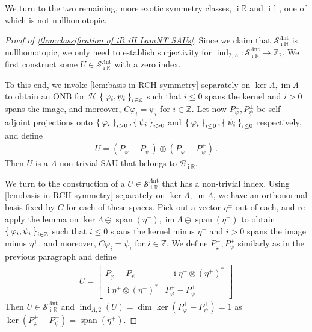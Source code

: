 \documentclass[a4paper,10pt]{article}
\numberwithin{equation}{section}
\theoremstyle{plain}
\theoremstyle{plain}
\theoremstyle{plain}
\theoremstyle{plain}
\theoremstyle{plain}
\theoremstyle{remark}
\theoremstyle{definition}
\theoremstyle{plain}
\newcommand{\ii}{\operatorname{i}}
\newcommand{\ZZ}{\mathbb{Z}}
\newcommand{\RR}{\mathbb{R}}
\newcommand{\calB}{\mathcal{B}}
\newcommand{\calSU}{\mathcal{S}}
\newcommand{\calH}{\mathcal{H}}
\newcommand{\LamNT}{\Lambda\mathrm{nt}}
\newcommand{\LamNTSAU}{\calSU^{\LamNT}}
\newcommand{\szpan}{\operatorname{span}}
\newcommand{\vf}{\varphi}
\newcommand{\HH}{\mathbb{H}}
\newcommand{\findex}{\operatorname{ind}}
\newcommand{\im}{\operatorname{im}}
\newcommand{\eq}[1]{\begin{align*}#1\end{align*}}
\begin{document}
	
	We turn to the two remaining, more exotic symmetry classes, $\ii \RR$ and $\ii \HH$, one of which is not nullhomotopic.
	\begin{proof}[Proof of \cref{thm:classification of iR iH LamNT SAUs}] Since we claim that $\LamNTSAU_{\ii \HH}$ is nullhomotopic, we only need to establish surjectivity for $\findex_{2,\Lambda}:\LamNTSAU_{\ii \RR}\to\ZZ_2$. We first construct some $U\in\LamNTSAU_{\ii \RR}$ with a zero index. 
		
		To this end, we invoke \cref{lem:basis in RCH symmetry} separately on $\ker\Lambda,\im\Lambda$ to obtain an ONB for $\calH$ $\Set{\vf_i,\psi_i}_{i\in\ZZ}$ such that $i\leq0$ spans the kernel and $i>0$ spans the image, and moreover, $C\vf_i=\psi_i$ for $i\in\ZZ$. Let now $P^\pm_\vf,P^\pm_\psi$ be self-adjoint projections onto $\Set{\vf_i}_{i>0},\Set{\psi_i}_{i>0}$ and $\Set{\vf_i}_{i\leq0},\Set{\psi_i}_{i\leq0}$ respectively, and define \eq{U=(P_\vf^--P_\psi^-)\oplus (P_{\vf}^+-P_{\psi}^+)\,.} Then $U$ is a $\Lambda$-non-trivial SAU that belongs to $\calB_{\ii\RR}.$
		
		We turn to the construction of a $U\in\LamNTSAU_{\ii\RR}$ that has a non-trivial index. Using \cref{lem:basis in RCH symmetry} separately on $\ker\Lambda,\im\Lambda$, we have an orthonormal basis fixed by $C$ for each of these spaces. Pick out a vector $\eta^\pm$ out of each, and re-apply the lemma on $\ker\Lambda\ominus\szpan(\eta^-),\im\Lambda\ominus\szpan(\eta^+)$ to obtain $\Set{\vf_i,\psi_i}_{i\in\ZZ}$ such that $i\leq0$ spans the kernel minus $\eta^-$ and $i>0$ spans the image minus $\eta^+$, and moreover, $C\vf_i=\psi_i$ for $i\in\ZZ$. We define $P^\pm_\vf,P^\pm_\psi$ similarly as in the previous paragraph and define \eq{U=\begin{bmatrix} P_\vf^--P_\psi^- & -\ii\eta^-\otimes \left(\eta^+\right)^\ast \\ \ii\eta^+\otimes \left(\eta^-\right)^\ast & P_{\vf}^+-P_{\psi}^+\end{bmatrix}} Then $U\in\LamNTSAU_{\ii\RR}$ and $\findex_{\Lambda,2}(U)=\dim\ker (P_\vf^+-P_\psi^+)=1$ as $\ker (P_\vf^+-P_\psi^+)=\szpan(\eta^+)$.
		

\end{proof}
\end{document}
